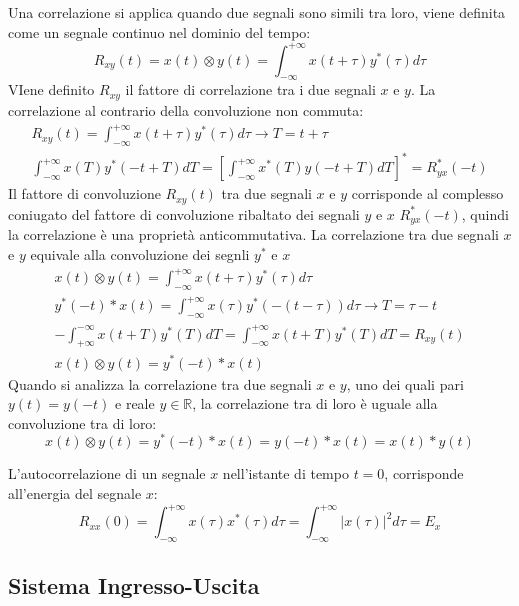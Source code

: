 \documentclass{article}
\numberwithin{equation}{subsection}
\begin{document}
Una correlazione si applica quando due segnali sono simili tra loro, viene definita come un segnale continuo nel dominio del tempo:
\begin{equation}
    R_{xy}(t)=x(t)\otimes y(t)=\int_{-\infty}^{+\infty}x(t+\tau)y^*(\tau)d\tau
\end{equation}
VIene definito $R_{xy}$ il fattore di correlazione tra i due segnali $x$ e $y$. La correlazione al contrario della convoluzione non commuta:
\begin{gather*}
    \displaystyle R_{xy}(t)=\int_{-\infty}^{+\infty}x(t+\tau)y^*(\tau)d\tau\to T=t+\tau\\
    \displaystyle\int_{-\infty}^{+\infty}x(T)y^*(-t+T)dT=\left[\int_{-\infty}^{+\infty}x^*(T)y(-t+T)dT\right]^*=R_{yx}^*(-t)
\end{gather*}
Il fattore di convoluzione $R_{xy}(t)$ tra due segnali $x$ e $y$ corrisponde al complesso coniugato del fattore di convoluzione ribaltato dei segnali $y$ e $x$ $R_{yx}^*(-t)$, 
quindi la correlazione è una proprietà anticommutativa. La correlazione tra due segnali $x$ e $y$ equivale alla convoluzione dei segnli $y^*$ e $x$
\begin{gather*}
    x(t)\otimes y(t)=\displaystyle\int_{-\infty}^{+\infty}x(t+\tau)y^*(\tau)d\tau\\
    y^*(-t)* x(t)=\displaystyle\int_{-\infty}^{+\infty}x(\tau)y^*(-(t-\tau))d\tau\to T=\tau-t\\
    -\int_{+\infty}^{-\infty}x(t+T)y^*(T)dT=\int_{-\infty}^{+\infty}x(t+T)y^*(T)dT=R_{xy}(t)\\
    x(t)\otimes y(t)=y^*(-t)*x(t)
\end{gather*}
Quando si analizza la correlazione tra due segnali $x$ e $y$, uno dei quali pari $y(t)=y(-t)$ e reale $y\in\mathbb{R}$, la correlazione tra di loro è uguale alla convoluzione 
tra di loro:
\begin{equation*}
    x(t)\otimes y(t)=y^*(-t)*x(t)=y(-t)*x(t)=x(t)*y(t)
\end{equation*}

L'autocorrelazione di un segnale $x$ nell'istante di tempo $t=0$, corrisponde all'energia del segnale $x$:
\begin{equation*}
    R_{xx}(0)=\displaystyle\int_{-\infty}^{+\infty}x(\tau)x^*(\tau)d\tau=\int_{-\infty}^{+\infty}|x(\tau)|^2d\tau=E_x
\end{equation*}

\subsection{Sistema Ingresso-Uscita}
\end{document}
